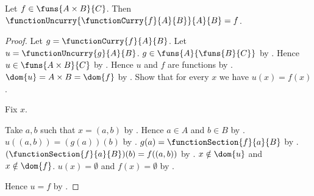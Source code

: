 \begin{proposition}\label{function_uncurry_curry}
    Let $f\in\funs{A\times B}{C}$.
    Then $\functionUncurry{\functionCurry{f}{A}{B}}{A}{B}=f$.
\end{proposition}
\begin{proof}
    Let $g=\functionCurry{f}{A}{B}$.
    Let $u=\functionUncurry{g}{A}{B}$.
    $g\in\funs{A}{\funs{B}{C}}$ by .
    Hence $u\in\funs{A\times B}{C}$ by .
    Hence $u$ and $f$ are functions by .
    $\dom{u}=A\times B=\dom{f}$ by .
    Show that for every $x$ we have $u(x)=f(x)$.
    \begin{subproof}
        Fix $x$.
        \begin{byCase}
                Take $a,b$ such that $x=(a,b)$
                    by .
                Hence $a\in A$ and $b\in B$ by .
                $u((a,b))=(g(a))(b)$
                    by .
                $g(a)=\functionSection{f}{a}{B}$
                    by .
                $(\functionSection{f}{a}{B})(b)=f((a,b))$
                    by .
                $x\notin\dom{u}$ and $x\notin\dom{f}$.
                $u(x)=\emptyset$ and $f(x)=\emptyset$
                    by .
        \end{byCase}
    \end{subproof}
    Hence $u=f$ by .
\end{proof}

